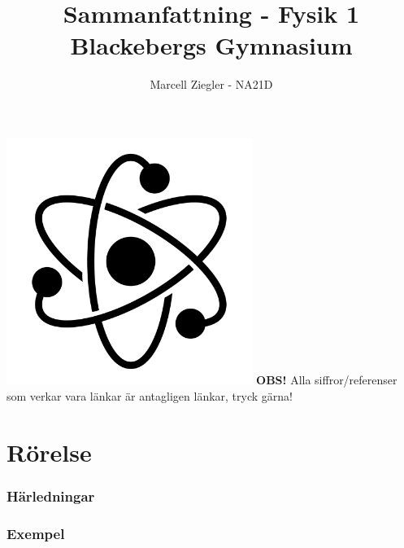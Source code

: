 \documentclass[12pt, a4paper]{article}
\title{Sammanfattning - Fysik 1 \\ Blackebergs Gymnasium}
\author{Marcell Ziegler - NA21D}
\theoremstyle{definition}
\begin{document}
    \begin{titlepage}
        \maketitle
        \centering
        \vfill
        \includegraphics[width=0.6\textwidth]{title.jpg}
        \vfill
        \textbf{OBS!} Alla siffror/referenser som verkar vara länkar är antagligen länkar, tryck gärna!
    \end{titlepage}

    \tableofcontents

    \newpage

    \part{Rörelse}
    

    \newpage
    \appendix
    \section{Härledningar}
    \label{appendix:härledning}
    
    \section{Exempel}
    \label{appendix:exempel}
\end{document}
